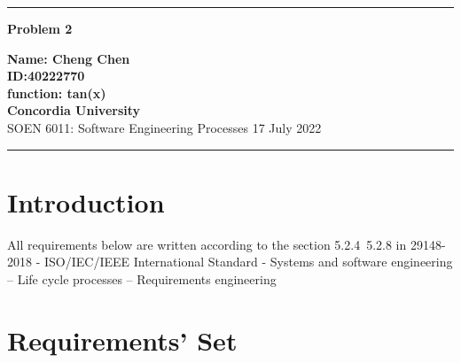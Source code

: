 \documentclass[10pt,a4paper,twoside]{article}
\begin{document}
\begin{center}
\hrule

\vspace{.4cm}
{\bf {\Huge Problem 2}}
\vspace{.2cm}
\end{center}
{\bf Name: Cheng Chen}  \\
{\bf ID:40222770}\\
{\bf function: tan(x)}\\
{\bf Concordia University}\\
SOEN 6011: Software Engineering Processes {\bf  } \hspace{\fill}  17 July  2022 \\
\hrule






\section{Introduction}
    All requirements below are written according to the section 5.2.4~5.2.8 in 29148-2018 - ISO/IEC/IEEE International Standard - Systems and software engineering -- Life cycle processes -- Requirements engineering\cite{8559686}
\section{Requirements' Set}
\end{document}
